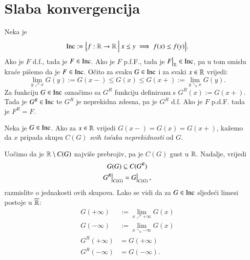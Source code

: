 
\chapter{Slaba konvergencija}

Neka je
\begin{equation*}
    \mathrm{Inc} := \Big\{ {f: \mathbb{R} \to \mathbb{R}} \: \Big| \: {x \leq y \implies f (x) \leq f(y)} \Big\}.
\end{equation*}
Ako je $F$ d.f., tada je $F \in \mathrm{Inc}$.
Ako je $F$ p.f.F., tada je $\restr{F}{\real} \in \inc$, pa u tom smislu kra\' ce pi\v semo da je $F \in \mathrm{Inc}$.
O\v cito za svaku $G \in \mathrm{Inc}$ i za svaki $x \in \mathbb{R}$ vrijedi:
\begin{equation}    \label{jed:16.1}
    \lim\limits_{y \nearrow x} G(y) := G(x -) \leq G (x) \leq G(x +) := \lim\limits_{y \searrow x} G(y).
\end{equation}
Za funkciju $G \in \mathrm{Inc}$ ozna\v cimo sa $G^R$ funkciju definiranu s $G^R (x) := G(x+)$.
Tada je $G^R \in \mathrm{Inc}$ te $G^R$ je neprekidna zdesna, pa je $G^R$ d.f.
Ako je $F$ p.d.F. tada je $F^R = F$.

\begin{defn}  \label{defn:16.1-1}
    Neka je $G \in \mathrm{Inc}$.
    Ako za $x \in \mathbb{R}$ vrijedi $G(x-) = G(x) = G(x+)$, ka\v zemo da $x$ pripada skupu $C(G)$ \emph{svih to\v caka neprekidnosti} od $G$.     
\end{defn}

Uo\v cimo da je $\mathbb{R} \setminus C(G)$ najvi\v se prebrojiv, pa je $C(G)$ gust u $\mathbb{R}$.
Nadalje, vrijedi
\begin{equation}    \label{jed:16.2}
    \begin{gathered}
        G(G) \subseteq C(G^R)\\
        \restr{G^R}{C(G)} = \restr{G}{C(G)},
    \end{gathered}
\end{equation}
razmislite o jednakosti ovih skupova.
Lako se vidi da za $G \in \mathrm{Inc}$ sljede\' ci limesi postoje u $\overline{\mathbb{R}}$:
\begin{equation}    \label{jed:16.3}
    \begin{aligned}
        G(+\infty) &:= \lim\limits_{x \nearrow +\infty} G(x)\\
        G(-\infty) &:= \lim\limits_{x \searrow -\infty} G(x)\\
        G^R(+\infty) &= G(+\infty)\\
        G^R(-\infty) &= G(-\infty).
    \end{aligned}
\end{equation}

